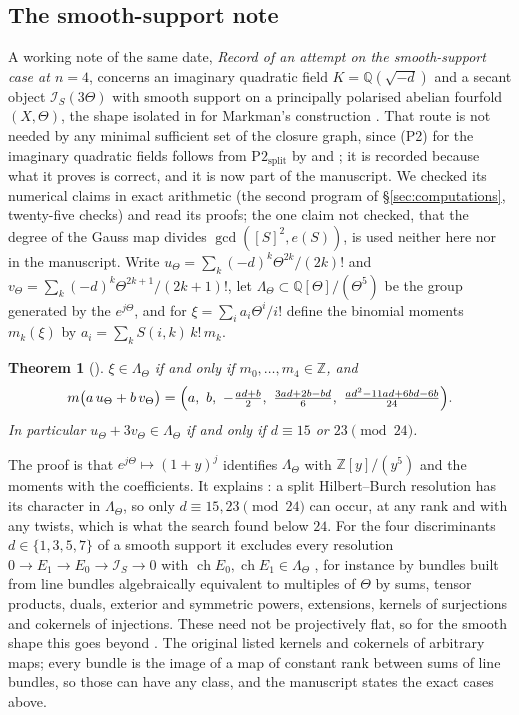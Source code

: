 \documentclass[11pt]{amsart}
\newtheorem{theorem}{Theorem}[section]
\theoremstyle{definition}
\theoremstyle{remark}
\newcommand{\QQ}{\mathbb{Q}}
\newcommand{\ZZ}{\mathbb{Z}}
\newcommand{\ch}{\operatorname{ch}}
\begin{document}
\subsection{The smooth-support note}\label{ssec:smooth}
A working note of the same date, \emph{Record of an attempt on the
smooth-support case at $n=4$}, concerns an imaginary quadratic field
$K=\QQ(\sqrt{-d})$ and a secant object $\mathcal{I}_{S}(3\Theta)$ with smooth
support on a principally polarised abelian fourfold $(X,\Theta)$, the shape
isolated in \cite[Corollary~18.66, Remark~18.67]{BMB} for Markman's
construction \cite{Mar25a,Mar25b}. That route is not needed by any minimal
sufficient set of the closure graph, since (P2) for the imaginary quadratic
fields follows from $\mathrm{P2}_{\mathrm{split}}$ by \cite[Proposition~20.13]{BMB}
and \cite[Theorem~20.58]{BMB}; it is recorded because what it proves is
correct, and it is now part of the manuscript. We checked its numerical
claims in exact arithmetic (the second program of \S\ref{sec:computations},
twenty-five checks) and read its proofs; the one claim not checked, that the
degree of the Gauss map divides $\gcd([S]^{2},e(S))$, is used neither here
nor in the manuscript. Write $u_{\Theta}=\sum_{k}(-d)^{k}\Theta^{2k}/(2k)!$ and
$v_{\Theta}=\sum_{k}(-d)^{k}\Theta^{2k+1}/(2k+1)!$, let
$\Lambda_{\Theta}\subset\QQ[\Theta]/(\Theta^{5})$ be the group generated by the
$e^{j\Theta}$, and for $\xi=\sum_{i}a_{i}\Theta^{i}/i!$ define the binomial
moments $m_{k}(\xi)$ by $a_{i}=\sum_{k}S(i,k)\,k!\,m_{k}$.

\begin{theorem}[{\cite[Lemma~18.56, Theorem~18.57]{BMB}}]\label{thm:lattice}
$\xi\in\Lambda_{\Theta}$ if and only if $m_{0},\dots,m_{4}\in\ZZ$, and
\[
  m\bigl(a\,u_{\Theta}+b\,v_{\Theta}\bigr)=\Bigl(a,\ b,\ -\tfrac{ad+b}{2},\
  \tfrac{3ad+2b-bd}{6},\ \tfrac{ad^{2}-11ad+6bd-6b}{24}\Bigr).
\]
In particular $u_{\Theta}+3v_{\Theta}\in\Lambda_{\Theta}$ if and only if
$d\equiv15$ or $23\pmod{24}$.
\end{theorem}

The proof is that $e^{j\Theta}\mapsto(1+y)^{j}$ identifies $\Lambda_{\Theta}$
with $\ZZ[y]/(y^{5})$ and the moments with the coefficients. It explains
\cite[Table~4]{BMB}: a split Hilbert--Burch resolution has its character in
$\Lambda_{\Theta}$, so only $d\equiv15,23\pmod{24}$ can occur, at any rank and
with any twists, which is what the search found below $24$. For the four
discriminants $d\in\{1,3,5,7\}$ of a smooth support
\cite[Corollary~18.41]{BMB} it excludes every resolution
$0\to E_{1}\to E_{0}\to\mathcal{I}_{S}\to0$ with $\ch E_{0},\ch E_{1}\in
\Lambda_{\Theta}$ \cite[Corollary~18.58]{BMB}, for instance by bundles built
from line bundles algebraically equivalent to multiples of $\Theta$ by sums,
tensor products, duals, exterior and symmetric powers, extensions, kernels of
surjections and cokernels of injections. These need not be projectively flat,
so for the smooth shape this goes beyond \cite[Theorems~18.61 and~18.64]{BMB}.
The original listed kernels and cokernels of arbitrary maps; every bundle is
the image of a map of constant rank between sums of line bundles, so those
can have any class, and the manuscript states the exact cases above.
\end{document}
